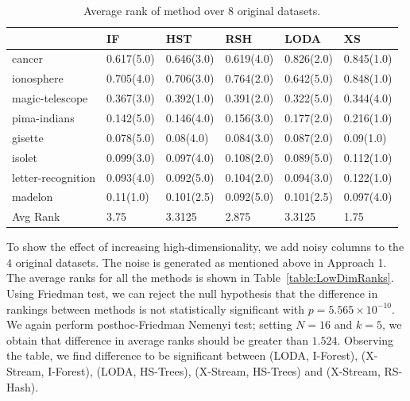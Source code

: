 \documentclass[11pt,onecolumn]{article}
\begin{document}
\begin{table}
    \centering
    \begin{tabular}{llllll}
    \toprule
                            & IF         & HST        & RSH        & LODA       & XS          \\	\hline
    cancer & 0.617(5.0) & 0.646(3.0) & 0.619(4.0) & 0.826(2.0) & 0.845(1.0) \\
    ionosphere              & 0.705(4.0) & 0.706(3.0) & 0.764(2.0) & 0.642(5.0) & 0.848(1.0) \\
    magic-telescope         & 0.367(3.0) & 0.392(1.0) & 0.391(2.0) & 0.322(5.0) & 0.344(4.0)  \\
    pima-indians            & 0.142(5.0) & 0.146(4.0) & 0.156(3.0) & 0.177(2.0) & 0.216(1.0) \\
    gisette                 & 0.078(5.0) & 0.08(4.0)  & 0.084(3.0) & 0.087(2.0) & 0.09(1.0) \\
    isolet                  & 0.099(3.0) & 0.097(4.0) & 0.108(2.0) & 0.089(5.0) & 0.112(1.0) \\
    letter-recognition      & 0.093(4.0) & 0.092(5.0) & 0.104(2.0) & 0.094(3.0) & 0.122(1.0) \\
    madelon                 & 0.11(1.0)  & 0.101(2.5) & 0.092(5.0) & 0.101(2.5) & 0.097(4.0) \\
    \midrule
    Avg Rank                & 3.75       & 3.3125     & 2.875      & 3.3125     & 1.75        \\
    \bottomrule
    \end{tabular}
    \caption{Average rank of method over 8 original datasets.}
    \label{table:OriginalRanks}
\end{table}

To show the effect of increasing high-dimensionality, we add noisy columns to the $4$ original datasets. The noise is generated as mentioned above in Approach 1. The average ranks for all the methods is shown in Table~\ref{table:LowDimRanks}. Using Friedman test, we can reject the null hypothesis that the difference in rankings between methods is not statistically significant with $p=5.565\times 10^{-10}$. We again perform posthoc-Friedman Nemenyi test; setting $N=16$ and $k=5$, we obtain that difference in average ranks should be greater than $1.524$. Observing the table, we find difference to be significant between (LODA, I-Forest), (X-Stream, I-Forest), (LODA, HS-Trees), (X-Stream, HS-Trees) and (X-Stream, RS-Hash).
\end{document}
